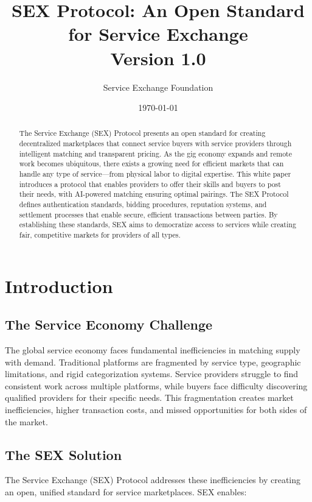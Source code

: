 \documentclass[11pt,a4paper]{article}
\title{\textbf{SEX Protocol: An Open Standard for Service Exchange}\\
\large Version 1.0}
\author{Service Exchange Foundation}
\date{\today}
\begin{document}
\maketitle

\begin{abstract}
\noindent The Service Exchange (SEX) Protocol presents an open standard for creating decentralized marketplaces that connect service buyers with service providers through intelligent matching and transparent pricing. As the gig economy expands and remote work becomes ubiquitous, there exists a growing need for efficient markets that can handle any type of service—from physical labor to digital expertise. This white paper introduces a protocol that enables providers to offer their skills and buyers to post their needs, with AI-powered matching ensuring optimal pairings. The SEX Protocol defines authentication standards, bidding procedures, reputation systems, and settlement processes that enable secure, efficient transactions between parties. By establishing these standards, SEX aims to democratize access to services while creating fair, competitive markets for providers of all types.
\end{abstract}

\tableofcontents
\newpage

\section{Introduction}

\subsection{The Service Economy Challenge}

The global service economy faces fundamental inefficiencies in matching supply with demand. Traditional platforms are fragmented by service type, geographic limitations, and rigid categorization systems. Service providers struggle to find consistent work across multiple platforms, while buyers face difficulty discovering qualified providers for their specific needs. This fragmentation creates market inefficiencies, higher transaction costs, and missed opportunities for both sides of the market.

\subsection{The SEX Solution}

The Service Exchange (SEX) Protocol addresses these inefficiencies by creating an open, unified standard for service marketplaces. SEX enables:
\end{document}
